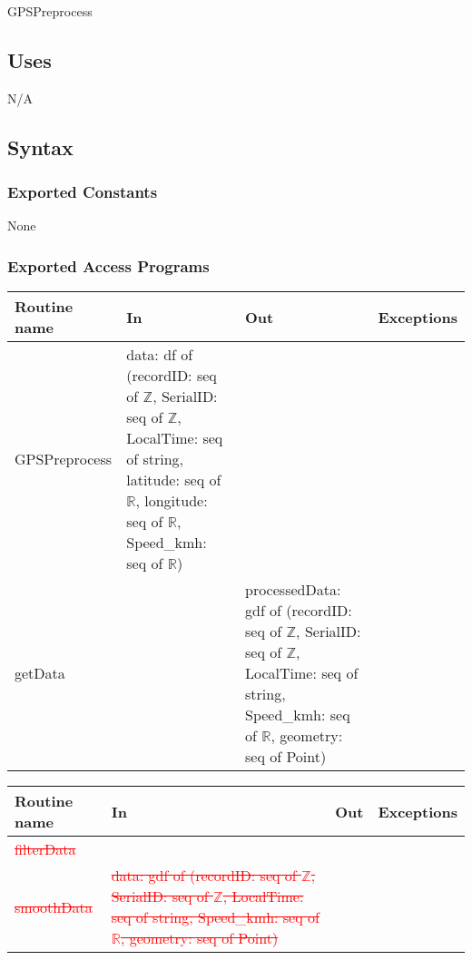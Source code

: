 \documentclass[12pt, titlepage]{article}
\begin{document}
GPSPreprocess

\subsection{Uses}

N/A

\subsection{Syntax}

\subsubsection{Exported Constants}

None

\subsubsection{Exported Access Programs}

\begin{center}
\begin{tabular}{| l | >{\raggedright}p{4cm} | >{\raggedright}p{4cm} | l |}%
\hline
\textbf{Routine name} & \textbf{In} & \textbf{Out} & \textbf{Exceptions}\\
\hline
GPSPreprocess & data: df of (recordID: seq of $\mathbb{Z}$, SerialID: seq of $\mathbb{Z}$, LocalTime: seq of string, latitude: seq of $\mathbb{R}$, longitude: seq of $\mathbb{R}$, Speed\_kmh: seq of $\mathbb{R}$) &  & \\
\hline
getData &  & processedData: gdf of (recordID: seq of $\mathbb{Z}$, SerialID: seq of $\mathbb{Z}$, LocalTime: seq of string, Speed\_kmh: seq of $\mathbb{R}$, geometry: seq of Point) & ~\\
\hline
\end{tabular}
\end{center}
\begin{center}
\begin{tabular}{| l | >{\raggedright}p{4cm} | >{\raggedright}p{4cm} | l |}%
\hline
\textbf{Routine name} & \textbf{In} & \textbf{Out} & \textbf{Exceptions}\\
\hline
\textcolor{red}{\sout{filterData}} & & & ~\\
\hline
\textcolor{red}{\sout{smoothData}} & \textcolor{red}{\sout{data: gdf of (recordID: seq of $\mathbb{Z}$, SerialID: seq of $\mathbb{Z}$, LocalTime: seq of string, Speed\_kmh: seq of $\mathbb{R}$, geometry: seq of Point)}} &   & ~\\
\hline
\end{tabular}
\end{center}
\end{document}

